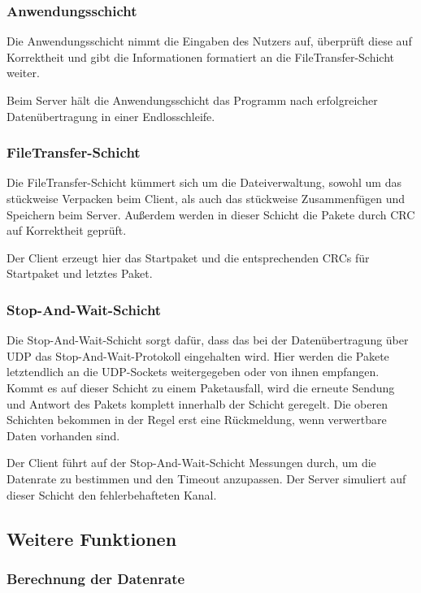 \documentclass{article}
\begin{document}
			\subsubsection{Anwendungsschicht}

			Die Anwendungsschicht nimmt die Eingaben des Nutzers auf, überprüft diese auf Korrektheit und gibt die Informationen formatiert an die FileTransfer-Schicht weiter.

			Beim Server hält die Anwendungsschicht das Programm nach erfolgreicher Datenübertragung in einer Endlosschleife.

			\subsubsection{FileTransfer-Schicht}

			Die FileTransfer-Schicht kümmert sich um die Dateiverwaltung, sowohl um das stückweise Verpacken beim Client, als auch das stückweise Zusammenfügen und Speichern beim Server. Außerdem werden in dieser Schicht die Pakete durch CRC auf Korrektheit geprüft.

			Der Client erzeugt hier das Startpaket und die entsprechenden CRCs für Startpaket und letztes Paket.

			\subsubsection{Stop-And-Wait-Schicht}

			Die Stop-And-Wait-Schicht sorgt dafür, dass das bei der Datenübertragung über UDP das Stop-And-Wait-Protokoll eingehalten wird. Hier werden die Pakete letztendlich an die UDP-Sockets weitergegeben oder von ihnen empfangen. Kommt es auf dieser Schicht zu einem Paketausfall, wird die erneute Sendung und Antwort des Pakets komplett innerhalb der Schicht geregelt. Die oberen Schichten bekommen in der Regel erst eine Rückmeldung, wenn verwertbare Daten vorhanden sind.

			Der Client führt auf der Stop-And-Wait-Schicht Messungen durch, um die Datenrate zu bestimmen und den Timeout anzupassen. Der Server simuliert auf dieser Schicht den fehlerbehafteten Kanal.

		\subsection{Weitere Funktionen}

			\subsubsection{Berechnung der Datenrate}
\end{document}
